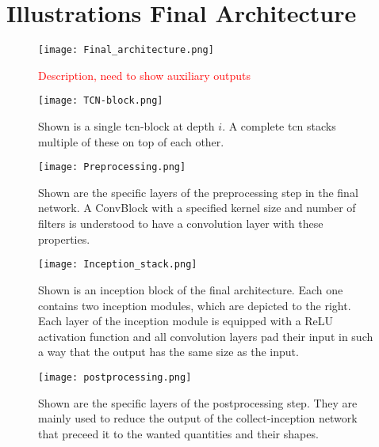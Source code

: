 \section{Illustrations Final Architecture}\label{app:illustrations_final_architecture}
\begin{figure}
\centering
\texttt{[image: Final\_architecture.png]}
\caption[Overview final architecture]{\textcolor{red}{Description, need to show auxiliary outputs}}\label{fig:high_level_final_network}
\end{figure}
\begin{figure}
\centering
\texttt{[image: TCN-block.png]}
\caption[TCN-Block]{Shown is a single \gls{tcn}-block at depth $i$. A complete \gls{tcn} stacks multiple of these on top of each other.}\label{fig:tcn_block}
\end{figure}
\begin{figure}
\centering
\texttt{[image: Preprocessing.png]}
\caption[Preprocessing of inception network]{Shown are the specific layers of the preprocessing step in the final network. A ConvBlock with a specified kernel size and number of  filters is understood to have a convolution layer with these properties.}\label{fig:preprocessing}
\end{figure}
\begin{figure}
\centering
\texttt{[image: Inception\_stack.png]}
\caption[Inception-Res Block]{Shown is an inception block of the final architecture. Each one contains two inception modules, which are depicted to the right. Each layer of the inception module is equipped with a ReLU activation function and all convolution layers pad their input in such a way that the output has the same size as the input.}\label{fig:inception_block}
\end{figure}
\begin{figure}
\centering
\texttt{[image: postprocessing.png]}
\caption[Postprocessing of inception network]{Shown are the specific layers of the postprocessing step. They are mainly used to reduce the output of the collect-inception network that preceed it to the wanted quantities and their shapes.}\label{fig:postprocessing}
\end{figure}
